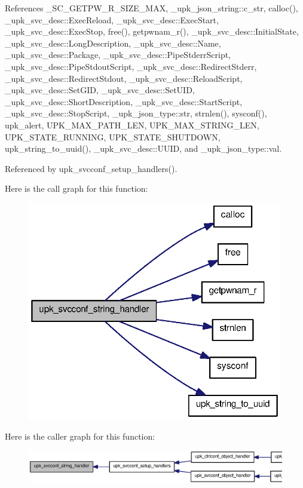 References \_\-SC\_\-GETPW\_\-R\_\-SIZE\_\-MAX, \_\-upk\_\-json\_\-string::c\_\-str, calloc(), \_\-upk\_\-svc\_\-desc::ExecReload, \_\-upk\_\-svc\_\-desc::ExecStart, \_\-upk\_\-svc\_\-desc::ExecStop, free(), getpwnam\_\-r(), \_\-upk\_\-svc\_\-desc::InitialState, \_\-upk\_\-svc\_\-desc::LongDescription, \_\-upk\_\-svc\_\-desc::Name, \_\-upk\_\-svc\_\-desc::Package, \_\-upk\_\-svc\_\-desc::PipeStderrScript, \_\-upk\_\-svc\_\-desc::PipeStdoutScript, \_\-upk\_\-svc\_\-desc::RedirectStderr, \_\-upk\_\-svc\_\-desc::RedirectStdout, \_\-upk\_\-svc\_\-desc::ReloadScript, \_\-upk\_\-svc\_\-desc::SetGID, \_\-upk\_\-svc\_\-desc::SetUID, \_\-upk\_\-svc\_\-desc::ShortDescription, \_\-upk\_\-svc\_\-desc::StartScript, \_\-upk\_\-svc\_\-desc::StopScript, \_\-upk\_\-json\_\-type::str, strnlen(), sysconf(), upk\_\-alert, UPK\_\-MAX\_\-PATH\_\-LEN, UPK\_\-MAX\_\-STRING\_\-LEN, UPK\_\-STATE\_\-RUNNING, UPK\_\-STATE\_\-SHUTDOWN, upk\_\-string\_\-to\_\-uuid(), \_\-upk\_\-svc\_\-desc::UUID, and \_\-upk\_\-json\_\-type::val.



Referenced by upk\_\-svcconf\_\-setup\_\-handlers().



Here is the call graph for this function:
\nopagebreak
\begin{figure}[H]
\begin{center}
\leavevmode
\includegraphics[width=316pt]{group__config__impl_ga8821dad50c00a183fb1fdbb1f950ebe0_cgraph}
\end{center}
\end{figure}




Here is the caller graph for this function:
\nopagebreak
\begin{figure}[H]
\begin{center}
\leavevmode
\includegraphics[width=400pt]{group__config__impl_ga8821dad50c00a183fb1fdbb1f950ebe0_icgraph}
\end{center}
\end{figure}


